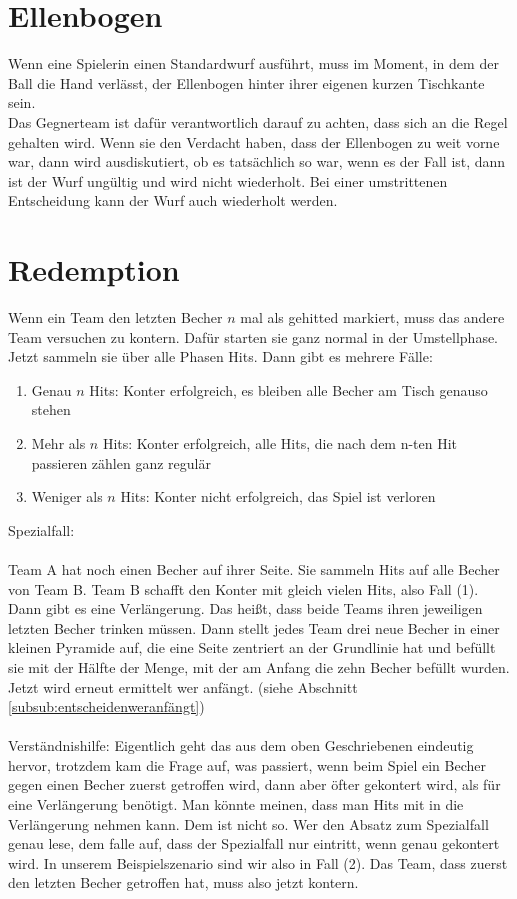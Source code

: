 \documentclass[a5paper, 12pt]{book}
\begin{document}
\section{Ellenbogen}\label{sec:ellenbogen}
Wenn eine Spielerin einen Standardwurf ausführt, muss im Moment, in dem der Ball die Hand verlässt, der Ellenbogen hinter ihrer eigenen kurzen Tischkante sein.\\
Das Gegnerteam ist dafür verantwortlich darauf zu achten, dass sich an die Regel gehalten wird. Wenn sie den Verdacht haben, dass der Ellenbogen zu weit vorne war, dann wird ausdiskutiert, ob es tatsächlich so war, wenn es der Fall ist, dann ist der Wurf ungültig und wird nicht wiederholt. Bei einer umstrittenen Entscheidung kann der Wurf auch wiederholt werden.

\section{Redemption}\label{sec:redemption}
Wenn ein Team den letzten Becher $n$ mal als gehitted markiert, muss das andere Team versuchen zu kontern. Dafür starten sie ganz normal in der Umstellphase. Jetzt sammeln sie über alle Phasen Hits. Dann gibt es mehrere Fälle:
\begin{enumerate}[(1)]
    \item Genau $n$ Hits: Konter erfolgreich, es bleiben alle Becher am Tisch genauso stehen
    \item Mehr als $n$ Hits: Konter erfolgreich, alle Hits, die nach dem n-ten Hit passieren zählen ganz regulär
    \item Weniger als $n$ Hits: Konter nicht erfolgreich, das Spiel ist verloren
\end{enumerate}
Spezialfall:\\\\
Team A hat noch einen Becher auf ihrer Seite. Sie sammeln Hits auf alle Becher von Team B. Team B schafft den Konter mit gleich vielen Hits, also Fall (1).\\
Dann gibt es eine Verlängerung. Das heißt, dass beide Teams ihren jeweiligen letzten Becher trinken müssen. Dann stellt jedes Team drei neue Becher in einer kleinen Pyramide auf, die eine Seite zentriert an der Grundlinie hat und befüllt sie mit der Hälfte der Menge, mit der am Anfang die zehn Becher befüllt wurden. Jetzt wird erneut ermittelt wer anfängt. (siehe Abschnitt \ref{subsub:entscheidenweranfängt})\\\\
Verständnishilfe: Eigentlich geht das aus dem oben Geschriebenen eindeutig hervor, trotzdem kam die Frage auf, was passiert, wenn beim Spiel ein Becher gegen einen Becher zuerst getroffen wird, dann aber öfter gekontert wird, als für eine Verlängerung benötigt. Man könnte meinen, dass man Hits mit in die Verlängerung nehmen kann. Dem ist nicht so. Wer den Absatz zum Spezialfall genau lese, dem falle auf, dass der Spezialfall nur eintritt, wenn genau gekontert wird. In unserem Beispielszenario sind wir also in Fall (2). Das Team, dass zuerst den letzten Becher getroffen hat, muss also jetzt kontern. 
\end{document}
